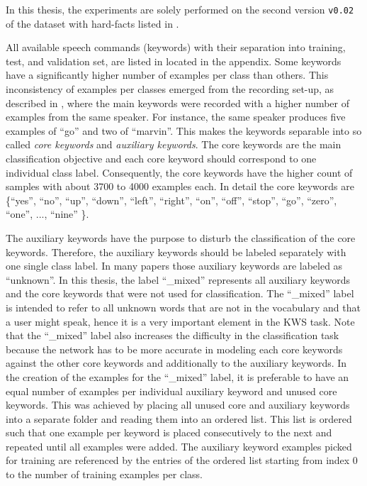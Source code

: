 In this thesis, the experiments are solely performed on the second version \texttt{v0.02} of the dataset with hard-facts listed in .

All available speech commands (keywords) with their separation into training, test, and validation set, are listed in  located in the appendix.
Some keywords have a significantly higher number of examples per class than others.
This inconsistency of examples per classes emerged from the recording set-up, as described in \cite{Warden2018}, where the main keywords were recorded with a higher number of examples from the same speaker.
For instance, the same speaker produces five examples of \enquote{go} and two of \enquote{marvin}.
This makes the keywords separable into so called \emph{core keywords} and \emph{auxiliary keywords}.
The core keywords are the main classification objective and each core keyword should correspond to one individual class label.
Consequently, the core keywords have the higher count of samples with about 3700 to 4000 examples each.
In detail the core keywords are \{\enquote{yes}, \enquote{no}, \enquote{up}, \enquote{down}, \enquote{left}, \enquote{right}, \enquote{on}, \enquote{off}, \enquote{stop}, \enquote{go}, \enquote{zero}, \enquote{one}, ..., \enquote{nine} \}.

The auxiliary keywords have the purpose to disturb the classification of the core keywords.
Therefore, the auxiliary keywords should be labeled separately with one single class label.
In many papers those auxiliary keywords are labeled as \enquote{unknown}.
In this thesis, the label \enquote{\_mixed} represents all auxiliary keywords and the core keywords that were not used for classification.
The \enquote{\_mixed} label is intended to refer to all unknown words that are not in the vocabulary and that a user might speak, hence it is a very important element in the KWS task.
Note that the \enquote{\_mixed} label also increases the difficulty in the classification task because the network has to be more accurate in modeling each core keywords against the other core keywords and additionally to the auxiliary keywords.
In the creation of the examples for the \enquote{\_mixed} label, it is preferable to have an equal number of examples per individual auxiliary keyword and unused core keywords.
This was achieved by placing all unused core and auxiliary keywords into a separate folder and reading them into an ordered list.
This list is ordered such that one example per keyword is placed consecutively to the next and repeated until all examples were added.
The auxiliary keyword examples picked for training are referenced by the entries of the ordered list starting from index 0 to the number of training examples per class.

